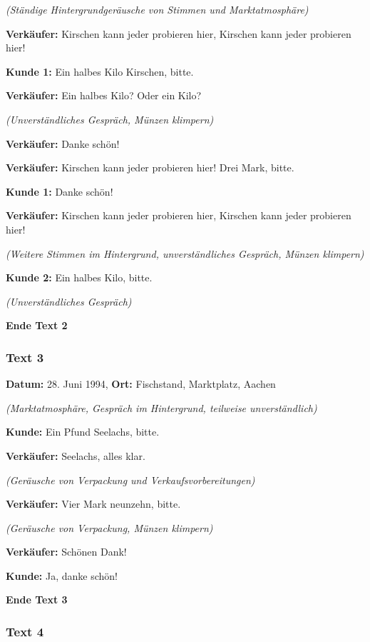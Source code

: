 \documentclass[
]{article}
\begin{document}
\emph{(Ständige Hintergrundgeräusche von Stimmen und Marktatmosphäre)}

\textbf{Verkäufer:} Kirschen kann jeder probieren hier, Kirschen kann
jeder probieren hier!

\textbf{Kunde 1:} Ein halbes Kilo Kirschen, bitte.

\textbf{Verkäufer:} Ein halbes Kilo? Oder ein Kilo?

\emph{(Unverständliches Gespräch, Münzen klimpern)}

\textbf{Verkäufer:} Danke schön!

\textbf{Verkäufer:} Kirschen kann jeder probieren hier! Drei Mark,
bitte.

\textbf{Kunde 1:} Danke schön!

\textbf{Verkäufer:} Kirschen kann jeder probieren hier, Kirschen kann
jeder probieren hier!

\emph{(Weitere Stimmen im Hintergrund, unverständliches Gespräch, Münzen
klimpern)}

\textbf{Kunde 2:} Ein halbes Kilo, bitte.

\emph{(Unverständliches Gespräch)}

\textbf{Ende Text 2}

\subsubsection{\texorpdfstring{\textbf{Text 3}}{Text 3}}\label{text-3}

\textbf{Datum:} 28. Juni 1994, \textbf{Ort:} Fischstand, Marktplatz,
Aachen

\emph{(Marktatmosphäre, Gespräch im Hintergrund, teilweise
unverständlich)}

\textbf{Kunde:} Ein Pfund Seelachs, bitte.

\textbf{Verkäufer:} Seelachs, alles klar.

\emph{(Geräusche von Verpackung und Verkaufsvorbereitungen)}

\textbf{Verkäufer:} Vier Mark neunzehn, bitte.

\emph{(Geräusche von Verpackung, Münzen klimpern)}

\textbf{Verkäufer:} Schönen Dank!

\textbf{Kunde:} Ja, danke schön!

\textbf{Ende Text 3}

\subsubsection{\texorpdfstring{\textbf{Text 4}}{Text 4}}\label{text-4}
\end{document}
